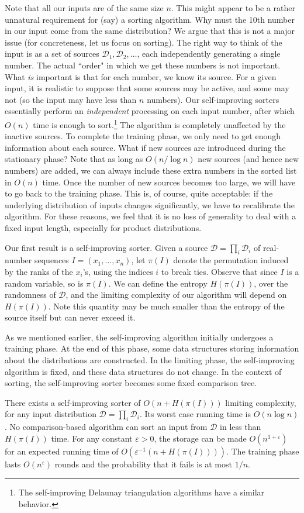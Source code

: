 \documentclass{siamltex}
\newcommand{\D}{\mathcal{D}}
\newcommand{\eps}{\varepsilon}
\begin{document}
Note that all our inputs are of the same size $n$. This might appear
to be a rather unnatural requirement for (say) a sorting algorithm.
Why must the 10th number in our input come from the same distribution?
We argue that this is not a major issue (for concreteness,
let us focus on sorting). The right way to think
of the input is as a set of sources $\D_1,\D_2,\ldots$,
each independently generating a single number. The actual ``order"
in which we get these numbers is not important. What \emph{is} important
is that for each number, we know its source. For a given input,
it is realistic to suppose that some sources may be active,
and some may not (so the input may have less than $n$ numbers).
Our self-improving sorters essentially perform an \emph{independent}
processing on each input number, after which $O(n)$ time is enough
to sort.\footnote{The self-improving Delaunay triangulation algorithms
have a similar behavior.} The algorithm is completely unaffected by the 
inactive sources. To complete the training phase, we only need to get
enough information about each source. 
What if new sources are introduced during the stationary
phase? Note that as long as $O(n/\log n)$ new sources (and hence
new numbers) are added, we can always include these extra numbers
in the sorted list in $O(n)$ time. Once the number of new sources
becomes too large, we will have to go back to the training phase. This
is, of course, quite acceptable: if the underlying distribution
of inputs changes significantly, we have to recalibrate
the algorithm. For these reasons, we feel that it is no loss
of generality to deal with a fixed input length, especially
for product distributions.

Our first result is a self-improving sorter.
Given a source $\D = \prod_i \D_i$ of real-number sequences 
$I = (x_1,\ldots,x_n)$,
let $\pi(I)$ denote the permutation induced by the ranks of the $x_i$'s,
using the indices $i$ to break ties. Observe that since $I$
is a random variable, so is $\pi(I)$.
We can define the entropy $H(\pi(I))$, over
the randomness of $\D$, and
the limiting complexity of our algorithm will depend on
$H(\pi(I))$. Note this quantity may be much smaller
than the entropy of the source itself but can never exceed it.

As we mentioned earlier, the self-improving algorithm
initially undergoes a training phase. At the end of this
phase, some data structures storing information about
the distributions are constructed. In the limiting phase,
the self-improving algorithm is fixed, and
these data structures do not change. In the context of sorting,
the self-improving sorter becomes some fixed comparison tree.
\medskip
\begin{theorem}\label{thm:sort-with-preprocessing}
There exists a self-improving sorter of 
$O(n+H(\pi(I)))$ limiting complexity,
for any input distribution $\D = \prod_i \D_i$.
Its worst case running time is $O(n\log n)$.
No comparison-based algorithm can sort an input from
$\D$ in less than $H(\pi(I))$ time.
For any constant $\eps>0$,
the storage can be made $O(n^{1+\eps})$ for 
an expected running time of $O(\eps^{-1}(n+ H(\pi(I))))$.
The training phase lasts $O(n^{\eps})$ rounds and the probability
that it fails is at most $1/n$.
\end{theorem}
\medskip
\end{document}
